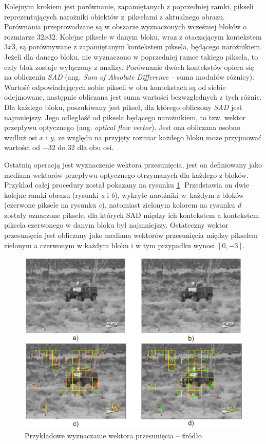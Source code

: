 Kolejnym krokiem jest porównanie, zapamiętanych z poprzedniej ramki, pikseli reprezentujących narożniki obiektów z~pikselami z aktualnego obrazu. Porównania przeprowadzane są w obszarze wyznaczonych wcześniej bloków o rozmiarze $32x32$. Kolejne piksele w danym bloku, wraz z otaczającym kontekstem $3x3$, są porównywane z zapamiętanym kontekstem piksela, będącego narożnikiem. Jeżeli dla danego bloku, nie wyznaczono w poprzedniej ramce takiego piksela, to cały blok zostaje wyłączony z analizy. Porównanie dwóch kontekstów opiera się na obliczeniu \textit{SAD} (ang. \textit{Sum of Absolute Difference} -- suma modułów różnicy). Wartość odpowiadających sobie pikseli w obu kontekstach są od siebie odejmowane, następnie obliczana jest suma wartości bezwzględnych z tych różnic. Dla każdego bloku, poszukiwany jest piksel, dla którego obliczony \textit{SAD} jest najmniejszy. Jego odległość od piksela będącego narożnikiem, to tzw. wektor przepływu optycznego (ang. \textit{optical flow vector}). 
Jest ona obliczana osobno wzdłuż osi $x$ i $y$, ze względu na przyjęty rozmiar każdego bloku może przyjmować wartości od $-32$ do $32$ dla obu osi.

Ostatnią operacją jest wyznaczenie wektora przesunięcia, jest on definiowany jako mediana wektorów przepływu optycznego otrzymanych dla każdego z bloków. 
Przykład całej procedury został pokazany na rysunku \ref{fig:vibe_of_example}. 
Przedstawia on dwie kolejne ramki obrazu (rysunki \textit{a} i \textit{b}), wykryte narożniki w~każdym z bloków (czerwone piksele na rysunku \textit{c}), natomiast zielonym kolorem na rysunku \textit{d} zostały oznaczone piksele, dla których SAD między ich kontekstem a kontekstem piksela czerwonego w danym bloku był najmniejszy. 
Ostateczny wektor przesunięcia jest obliczany jako mediana wektorów przesunięcia między pikselem zielonym a czerwonym w każdym bloku i w tym przypadku wynosi $[0,-3]$.

	\begin{figure}[h]
		\centering
		\includegraphics[scale=0.65]{img/3/of_example.png}
		\caption{Przykładowe wyznaczanie wektora przesunięcia -- źródło \cite{kryjak_14_vibe}}
		\label{fig:vibe_of_example}
	\end{figure}

